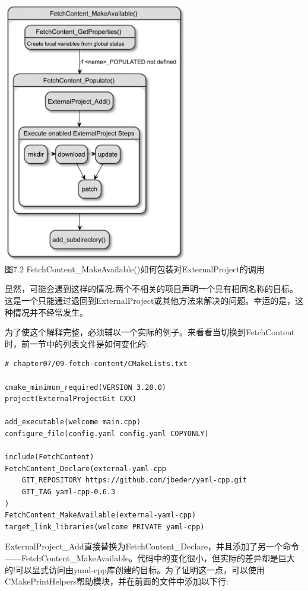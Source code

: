 \begin{center}
\includegraphics[width=0.6\textwidth]{content/2/chapter7/images/2.jpg}\\
图7.2  FetchContent\_MakeAvailable()如何包装对ExternalProject的调用
\end{center}

显然，可能会遇到这样的情况:两个不相关的项目声明一个具有相同名称的目标。这是一个只能通过退回到ExternalProject或其他方法来解决的问题。幸运的是，这种情况并不经常发生。

为了使这个解释完整，必须辅以一个实际的例子。来看看当切换到FetchContent时，前一节中的列表文件是如何变化的:

\begin{lstlisting}[style=styleCMake]
# chapter07/09-fetch-content/CMakeLists.txt

cmake_minimum_required(VERSION 3.20.0)
project(ExternalProjectGit CXX)

add_executable(welcome main.cpp)
configure_file(config.yaml config.yaml COPYONLY)

include(FetchContent)
FetchContent_Declare(external-yaml-cpp
	GIT_REPOSITORY https://github.com/jbeder/yaml-cpp.git
	GIT_TAG yaml-cpp-0.6.3
)
FetchContent_MakeAvailable(external-yaml-cpp)
target_link_libraries(welcome PRIVATE yaml-cpp)
\end{lstlisting} 

ExternalProject\_Add直接替换为FetchContent\_Declare，并且添加了另一个命令——FetchContent\_MakeAvailable。代码中的变化很小，但实际的差异却是巨大的!可以显式访问由yaml-cpp库创建的目标。为了证明这一点，可以使用CMakePrintHelpers帮助模块，并在前面的文件中添加以下行:

